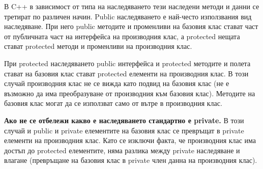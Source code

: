 \documentclass[fleqn,12pt]{article}
\begin{document}
В C++ в зависимост от типа на наследяването тези наследени методи и данни се третират по различен начин. Public наследяването е най-често използвания вид наследяване. При него public методите и променливи на базовия клас стават част от публичната част на интерфейса на производния клас, а protected нещата стават protected методи и променливи на производния клас.

При protected наследяването public интерфейса и protected методите и полета стават на базовия клас стават protected елементи на производния клас. В този случай производния клас не се вижда като подвид на базовия клас (не е възможно да има преобразуване от производния към базовия клас). Методите на базовия клас могат да се използват само от вътре в производния клас.

\textbf{Ако не се отбележи какво е наследяването стандартно е private.} В този случай и public и private елементите на базовия клас се превръщат в private елементи на производния клас. Като се изключи факта, че производния клас има достъп до protected елементите, няма разлика между private наследяване и влагане (превръщане на базовия клас в private член данна на производния клас).
\end{document}

